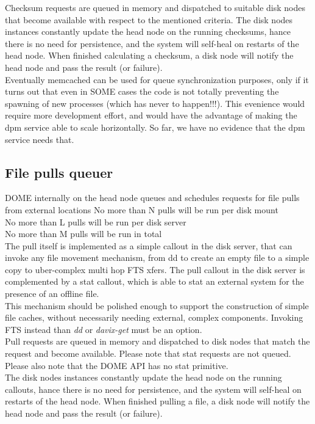 \documentclass[a4paper,10pt]{scrreprt}
\begin{document}
 Checksum requests are queued in memory and dispatched to suitable disk nodes that become available with respect to the mentioned criteria. The disk nodes instances constantly update the head node on the running checksums, hance there is no need for persistence,
 and the system will self-heal on restarts of the head node. When finished calculating a checksum, a disk node will notify the head node and pass the result (or failure).\\
 Eventually memcached can be used for queue synchronization purposes, only if it turns out that even in SOME cases the code is not totally
 preventing the spawning of new processes (which has never to happen!!!). This evenience would require more development effort, and would have the
 advantage of making the dpm service able to scale horizontally. So far, we have no evidence that the dpm service needs that.\\

\subsection{File pulls queuer}
DOME internally on the head node queues and schedules requests for file pulls from external locations
 No more than N pulls will be run per disk mount\\
 No more than L pulls will be run per disk server\\
 No more than M pulls will be run in total\\
 
The pull itself is implemented as a simple callout in the disk server, that can invoke any file movement mechanism, from
dd to create an empty file to a simple copy to uber-complex multi hop FTS xfers.
The pull callout in the disk server is complemented by a stat callout, which is able to stat an external system for the presence of an offline file.\\
This mechanism should be polished enough to support the construction of simple file caches,
without necessarily needing external, complex components. Invoking FTS instead than \textit{dd} or \textit{davix-get} must be an option.\\


Pull requests are queued in memory and dispatched to disk nodes that match the request and become available. Please note that stat requests are not queued. Please also note that the DOME API has no stat primitive.\\
The disk nodes instances constantly update the head node on the running callouts, hance there is no need for persistence,
and the system will self-heal on restarts of the head node. When finished pulling a file, a disk node will notify the head node and pass the result (or failure).\\
\end{document}
